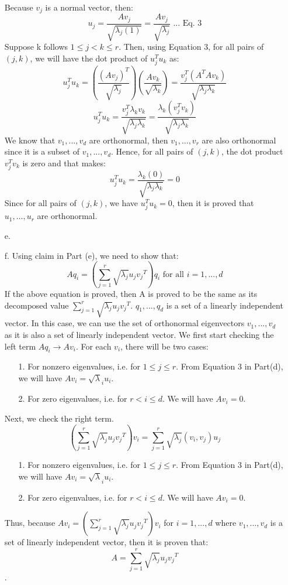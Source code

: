 \documentclass[twoside]{homework}
\begin{document}
\begin{itemize}
    Because $v_j$ is a normal vector, then:
    $$ u_j = \frac{Av_j}{\sqrt{{\lambda}_j(1)}} = \frac{Av_j}{\sqrt{{\lambda}_j}} \text{ ... Eq. 3}$$
    Suppose k follows $1\leq{j}<k\leq{r}$.
    Then, using Equation 3, for all pairs of $(j, k)$, we will have the dot product of $u_j^Tu_k$ as:
    $$ u_j^Tu_k = (\frac{(Av_j)^T}{\sqrt{{\lambda}_j}}) (\frac{Av_k}{\sqrt{{\lambda}_k}}) = \frac{v_j^T(A^TAv_k)}{\sqrt{{\lambda}_j\lambda_k}} $$
    $$ u_j^Tu_k =
    \frac{v_j^T{\lambda}_kv_k}{\sqrt{{\lambda}_j\lambda_k}} = \frac{{\lambda}_k(v_j^Tv_k)}{\sqrt{{\lambda}_j\lambda_k}} $$
    We know that $v_1, ..., v_d$ are orthonormal, then $v_1, ..., v_r$ are also orthonormal since it is a subset of $v_1, ..., v_d$. Hence, for all pairs of $(j,k)$, the dot product $v_j^Tv_k$ is zero and that makes:
    $$ u_j^Tu_k = \frac{{\lambda}_k(0)}{\sqrt{{\lambda}_j\lambda_k}} = 0$$
    Since for all pairs of $(j,k)$, we have $u_j^Tu_k = 0$, then it is proved that $u_1, ..., u_r$ are orthonormal.
    \item[e.]
    \item[f.] Using claim in Part (e), we need to show that:
    $$Aq_i=(\sum_{j=1}^r\sqrt{{\lambda}_j}u_j{v_j}^T)q_i \text{ for all } i=1,...,d$$
    If the above equation is proved, then A is proved to be the same as its decomposed value $\sum_{j=1}^r\sqrt{{\lambda}_j}u_j{v_j}^T$. $q_1, ..., q_d$ is a set of a linearly independent vector. In this case, we can use the set of orthonormal eigenvectors $v_1, ..., v_d$ as it is also a set of linearly independent vector.
    \newline\newline
    We first start checking the left term $Aq_i\xrightarrow{}Av_i$. For each $v_i$, there will be two cases:
    \begin{itemize}
        \item[1.] For nonzero eigenvalues, i.e. for $1\leq{j}\leq{r}$. From Equation 3 in Part(d), we will have $Av_i = \sqrt{\lambda}_iu_i$.
        \item[2.] For zero eigenvalues, i.e. for $r<i\leq{d}$. We will have $ Av_i = 0$.
    \end{itemize}
    Next, we check the right term.
    $$(\sum_{j=1}^r\sqrt{{\lambda}_j}u_j{v_j}^T)v_i = \sum_{j=1}^r\sqrt{{\lambda}_j}(v_i, v_j)u_j$$
    \begin{itemize}
        \item[1.] For nonzero eigenvalues, i.e. for $1\leq{j}\leq{r}$. From Equation 3 in Part(d), we will have $Av_i = \sqrt{\lambda}_iu_i$.
        \item[2.] For zero eigenvalues, i.e. for $r<i\leq{d}$. We will have $ Av_i = 0$.
    \end{itemize}
    Thus, because $Av_i=(\sum_{j=1}^r\sqrt{{\lambda}_j}u_j{v_j}^T)v_i$ for $i=1,...,d$ where $v_1,...,v_d$ is a set of linearly independent vector, then it is proven that:
    $$A=\sum_{j=1}^r\sqrt{{\lambda}_j}u_j{v_j}^T$$.
\end{itemize}
\newpage
\end{document}
